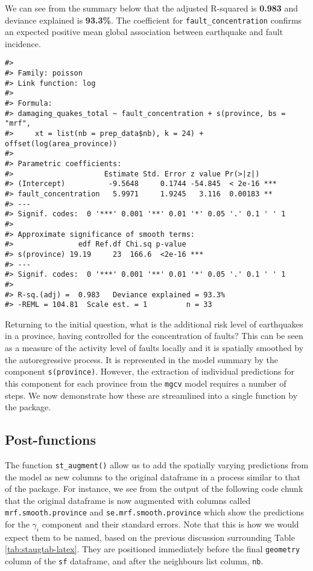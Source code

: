 We can see from the summary below that the adjusted R-squared is \textbf{0.983} and deviance explained is \textbf{93.3\%}. The coefficient for \texttt{fault\_concentration} confirms an expected positive mean global association between earthquake and fault incidence.

\begin{verbatim}
#> 
#> Family: poisson 
#> Link function: log 
#> 
#> Formula:
#> damaging_quakes_total ~ fault_concentration + s(province, bs = "mrf", 
#>     xt = list(nb = prep_data$nb), k = 24) + offset(log(area_province))
#> 
#> Parametric coefficients:
#>                     Estimate Std. Error z value Pr(>|z|)    
#> (Intercept)          -9.5648     0.1744 -54.845  < 2e-16 ***
#> fault_concentration   5.9971     1.9245   3.116  0.00183 ** 
#> ---
#> Signif. codes:  0 '***' 0.001 '**' 0.01 '*' 0.05 '.' 0.1 ' ' 1
#> 
#> Approximate significance of smooth terms:
#>               edf Ref.df Chi.sq p-value    
#> s(province) 19.19     23  166.6  <2e-16 ***
#> ---
#> Signif. codes:  0 '***' 0.001 '**' 0.01 '*' 0.05 '.' 0.1 ' ' 1
#> 
#> R-sq.(adj) =  0.983   Deviance explained = 93.3%
#> -REML = 104.81  Scale est. = 1         n = 33
\end{verbatim}

Returning to the initial question, what is the additional risk level of earthquakes in a province, having controlled for the concentration of faults? This can be seen as a measure of the activity level of faults locally and it is spatially smoothed by the autoregressive process. It is represented in the model summary by the component \texttt{s(province)}. However, the extraction of individual predictions for this component for each province from the \texttt{mgcv} model requires a number of steps. We now demonstrate how these are streamlined into a single function by the  package.

\subsection{Post-functions}\label{post-functions-1}

The function \texttt{st\_augment()} allow us to add the spatially varying predictions from the model as new columns to the original dataframe in a process
similar to that of the  package. For instance, we see from the output of the following code chunk that the original dataframe is now augmented with columns called \texttt{mrf.smooth.province} and \texttt{se.mrf.smooth.province} which show the predictions for the \(\gamma_i\) component and their standard errors. Note that this is how we would expect them to be named, based on the previous discussion surrounding Table \ref{tab:staugtab-latex}. They are positioned immediately before the final \texttt{geometry} column of the \texttt{sf} dataframe, and after the neighbours list column, \texttt{nb}.

